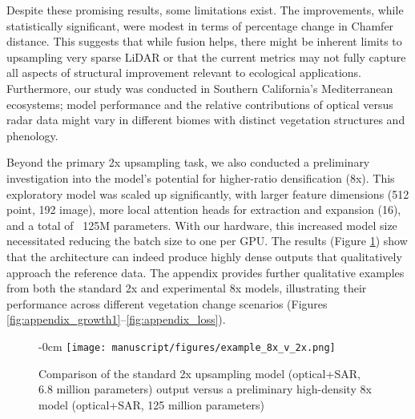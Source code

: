 \documentclass[remotesensing,article,submit,pdftex,moreauthors]{Definitions/mdpi}
\newenvironment{widefigure}[1][]{%
  \begin{figure}[#1]\begin{adjustwidth}{-\extralength}{0cm}\centering}{%
  \end{adjustwidth}\end{figure}}
\begin{document}
Despite these promising results, some limitations exist. The improvements, while statistically significant, were modest in terms of percentage change in Chamfer distance. This suggests that while fusion helps, there might be inherent limits to upsampling very sparse LiDAR or that the current metrics may not fully capture all aspects of structural improvement relevant to ecological applications. Furthermore, our study was conducted in Southern California's Mediterranean ecosystems; model performance and the relative contributions of optical versus radar data might vary in different biomes with distinct vegetation structures and phenology.

Beyond the primary 2x upsampling task, we also conducted a preliminary investigation into the model's potential for higher-ratio densification (8x). This exploratory model was scaled up significantly, with larger feature dimensions (512 point, 192 image), more local attention heads for extraction and expansion (16), and a total of ~125M parameters. With our hardware, this increased model size necessitated reducing the batch size to one per GPU. The results (Figure \ref{fig:upsampling_comparison_8x}) show that the architecture can indeed produce highly dense outputs that qualitatively approach the reference data. The appendix provides further qualitative examples from both the standard 2x and experimental 8x models, illustrating their performance across different vegetation change scenarios (Figures \ref{fig:appendix_growth1}--\ref{fig:appendix_loss}).

\begin{widefigure}[!b]
    \vspace{-10pt}  
    \centering
    \texttt{[image: manuscript/figures/example\_8x\_v\_2x.png]}
    \caption{Comparison of the standard 2x upsampling model (optical+SAR, 6.8 million parameters) output versus a preliminary high-density 8x model (optical+SAR, 125 million parameters)}
    \label{fig:upsampling_comparison_8x}
\end{widefigure}
\end{document}
